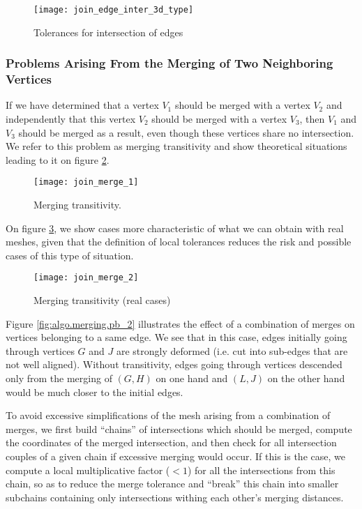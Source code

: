 \begin{figure}[!h]
\centerline{
\texttt{[image: join\_edge\_inter\_3d\_type]}}
\caption{Tolerances for intersection of edges}
\label{fig:algo.join.edgeint_type}
\end{figure}

\subsubsection{Problems Arising From the Merging of Two Neighboring Vertices
                \label{sec:join.pb_merge}}

If we have determined that a vertex $V_1$ should be merged with a
vertex $V_2$ and independently that this vertex $V_2$ should be
merged with a vertex $V_3$, then $V_1$ and $V_3$ should be
merged as a result, even though these vertices share no intersection.
We refer to this problem as merging transitivity and show
theoretical situations leading to it on figure \ref{fig:algo.merging.pb}.

\begin{figure}[!h]
\centerline{
\texttt{[image: join\_merge\_1]}}
\caption{Merging transitivity.}
\label{fig:algo.merging.pb}
\end{figure}

On figure \ref{fig:algo.merging.pb_1}, we show cases more
characteristic of what we can obtain with real meshes, given
that the definition of local tolerances reduces the risk and
possible cases of this type of situation.

\begin{figure}[!h]
\centerline{
\texttt{[image: join\_merge\_2]}}
\caption{Merging transitivity (real cases)}
\label{fig:algo.merging.pb_1}
\end{figure}

Figure \ref{fig:algo.merging.pb_2} illustrates the effect of
a combination of merges on vertices belonging to a same edge.
We see that in this case, edges initially going through
vertices $G$ and $J$ are strongly deformed (i.e. cut into
sub-edges that are not well aligned). Without transitivity,
edges going through vertices descended only from the merging
of $(G, H)$ on one hand and $(L, J)$ on the other hand
would be much closer to the initial edges.

To avoid excessive simplifications of the mesh arising from a
combination of merges, we first build ``chains'' of intersections
which should be merged, compute the coordinates of the merged
intersection, and then check for all intersection couples
of a given chain if excessive merging would occur. If this is the case,
we compute a local multiplicative factor ($< 1$) for all the
intersections from this chain, so as to reduce the merge tolerance
and ``break'' this chain into smaller subchains containing only
intersections withing each other's merging distances.

